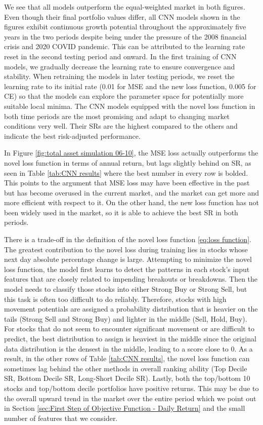 \documentclass[preprint,12pt,numafflabel,authoryear]{elsarticle}
\begin{document}
We see that all models outperform the equal-weighted market in both figures. Even though their final portfolio values differ, all CNN models shown in the figures exhibit continuous growth potential throughout the approximately five years in the two periods despite being under the pressure of the 2008 financial crisis and 2020 COVID pandemic. This can be attributed to the learning rate reset in the second testing period and onward. In the first training of CNN models, we gradually decrease the learning rate to ensure convergence and stability. When retraining the models in later testing periods, we reset the learning rate to its initial rate (0.01 for MSE and the new loss function, 0.005 for CE) so that the models can explore the parameter space for potentially more suitable local minima. The CNN models equipped with the novel loss function in both time periods are the most promising and adapt to changing market conditions very well. Their SRs are the highest compared to the others and indicate the best risk-adjusted performance.

In Figure \ref{fig:total asset simulation 06-10}, the MSE loss actually outperforms the novel loss function in terms of annual return, but lags slightly behind on SR, as seen in Table \ref{tab:CNN results} where the best number in every row is bolded. This points to the argument that MSE loss may have been effective in the past but has become overused in the current market, and the market can get more and more efficient with respect to it. On the other hand, the new loss function has not been widely used in the market, so it is able to achieve the best SR in both periods.

There is a trade-off in the definition of the novel loss function \eqref{eq:loss function}. The greatest contribution to the novel loss during training lies in stocks whose next day absolute percentage change is large. Attempting to minimize the novel loss function, the model first learns to detect the patterns in each stock's input features that are closely related to impending breakouts or breakdowns. Then the model needs to classify those stocks into either Strong Buy or Strong Sell, but this task is often too difficult to do reliably. Therefore, stocks with high movement potentials are assigned a probability distribution that is heavier on the tails (Strong Sell and Strong Buy) and lighter in the middle (Sell, Hold, Buy). For stocks that do not seem to encounter significant movement or are difficult to predict, the best distribution to assign is heaviest in the middle since the original data distribution is the densest in the middle, leading to a score close to 0. As a result, in the other rows of Table \ref{tab:CNN results}, the novel loss function can sometimes lag behind the other methods in overall ranking ability (Top Decile SR, Bottom Decile SR, Long-Short Decile SR). Lastly, both the top/bottom 10 stocks and top/bottom decile portfolios have positive returns. This may be due to the overall upward trend in the market over the entire period which we point out in Section \ref{sec:First Step of Objective Function - Daily Return} and the small number of features that we consider.
\end{document}
